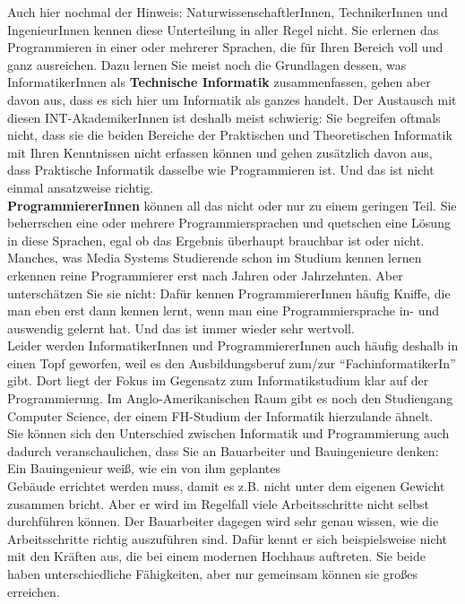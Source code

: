 Auch hier nochmal der Hinweis: NaturwissenschaftlerInnen, TechnikerInnen und IngenieurInnen kennen diese Unterteilung in aller Regel nicht. Sie erlernen das Programmieren in einer oder mehrerer Sprachen, die für Ihren Bereich voll und ganz ausreichen. Dazu lernen Sie meist noch die Grundlagen dessen, was InformatikerInnen als \textbf{Technische Informatik} zusammenfassen, gehen aber davon aus, dass es sich hier um Informatik als ganzes handelt. Der Austausch mit diesen INT-AkademikerInnen ist deshalb meist schwierig: Sie begreifen oftmals nicht, dass sie die beiden Bereiche der Praktischen und Theoretischen Informatik mit Ihren Kenntnissen nicht erfassen können und gehen zusätzlich davon aus, dass Praktische Informatik dasselbe wie Programmieren ist. Und das ist nicht einmal ansatzweise richtig.\\

\textbf{ProgrammiererInnen} können all das nicht oder nur zu einem geringen Teil. Sie beherrschen eine oder mehrere Programmiersprachen und quetschen eine Lösung in diese Sprachen, egal ob das Ergebnis überhaupt brauchbar ist oder nicht. Manches, was Media Systems Studierende schon im Studium kennen lernen erkennen reine Programmierer erst nach Jahren oder Jahrzehnten. Aber unterschätzen Sie sie nicht: Dafür kennen ProgrammiererInnen häufig Kniffe, die man eben erst dann kennen lernt, wenn man eine Programmiersprache in- und auswendig gelernt hat. Und das ist immer wieder sehr wertvoll. \\

Leider werden InformatikerInnen und ProgrammiererInnen auch häufig deshalb in einen Topf geworfen, weil es den Ausbildungsberuf zum/zur "`FachinformatikerIn"' gibt. Dort liegt der Fokus im Gegensatz zum Informatikstudium klar auf der Programmierung. Im Anglo-Amerikanischen Raum gibt es noch den Studiengang Computer Science, der einem FH-Studium der Informatik hierzulande ähnelt.\\

Sie können sich den Unterschied zwischen Informatik und Programmierung auch dadurch veranschaulichen, dass Sie an Bauarbeiter und Bauingenieure denken: Ein Bauingenieur weiß, wie ein von ihm geplantes\\Gebäude errichtet werden muss, damit es z.B. nicht unter dem eigenen Gewicht zusammen bricht. Aber er wird im Regelfall viele Arbeitsschritte nicht selbst durchführen können. Der Bauarbeiter dagegen wird sehr genau wissen, wie die Arbeitsschritte richtig auszuführen sind. Dafür kennt er sich beispielsweise nicht mit den Kräften aus, die bei einem modernen Hochhaus auftreten. Sie beide haben unterschiedliche Fähigkeiten, aber nur gemeinsam können sie großes erreichen.


